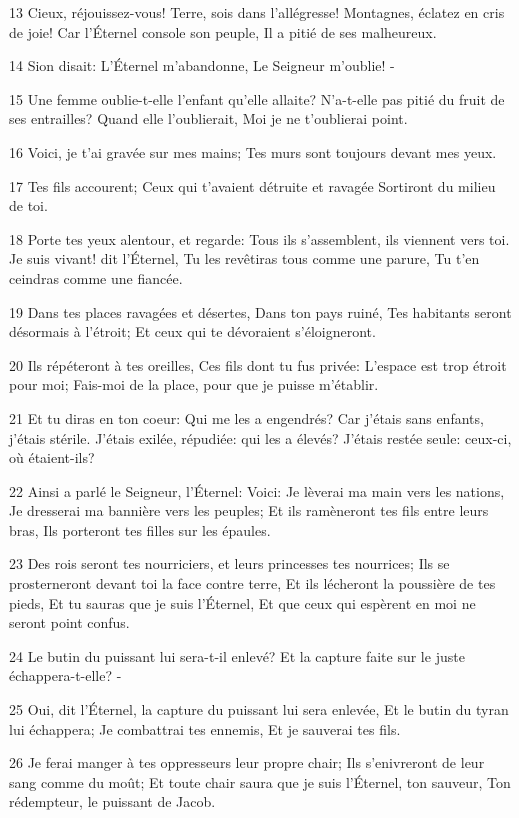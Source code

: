 \par 13 Cieux, réjouissez-vous! Terre, sois dans l'allégresse! Montagnes, éclatez en cris de joie! Car l'Éternel console son peuple, Il a pitié de ses malheureux.
\par 14 Sion disait: L'Éternel m'abandonne, Le Seigneur m'oublie! -
\par 15 Une femme oublie-t-elle l'enfant qu'elle allaite? N'a-t-elle pas pitié du fruit de ses entrailles? Quand elle l'oublierait, Moi je ne t'oublierai point.
\par 16 Voici, je t'ai gravée sur mes mains; Tes murs sont toujours devant mes yeux.
\par 17 Tes fils accourent; Ceux qui t'avaient détruite et ravagée Sortiront du milieu de toi.
\par 18 Porte tes yeux alentour, et regarde: Tous ils s'assemblent, ils viennent vers toi. Je suis vivant! dit l'Éternel, Tu les revêtiras tous comme une parure, Tu t'en ceindras comme une fiancée.
\par 19 Dans tes places ravagées et désertes, Dans ton pays ruiné, Tes habitants seront désormais à l'étroit; Et ceux qui te dévoraient s'éloigneront.
\par 20 Ils répéteront à tes oreilles, Ces fils dont tu fus privée: L'espace est trop étroit pour moi; Fais-moi de la place, pour que je puisse m'établir.
\par 21 Et tu diras en ton coeur: Qui me les a engendrés? Car j'étais sans enfants, j'étais stérile. J'étais exilée, répudiée: qui les a élevés? J'étais restée seule: ceux-ci, où étaient-ils?
\par 22 Ainsi a parlé le Seigneur, l'Éternel: Voici: Je lèverai ma main vers les nations, Je dresserai ma bannière vers les peuples; Et ils ramèneront tes fils entre leurs bras, Ils porteront tes filles sur les épaules.
\par 23 Des rois seront tes nourriciers, et leurs princesses tes nourrices; Ils se prosterneront devant toi la face contre terre, Et ils lécheront la poussière de tes pieds, Et tu sauras que je suis l'Éternel, Et que ceux qui espèrent en moi ne seront point confus.
\par 24 Le butin du puissant lui sera-t-il enlevé? Et la capture faite sur le juste échappera-t-elle? -
\par 25 Oui, dit l'Éternel, la capture du puissant lui sera enlevée, Et le butin du tyran lui échappera; Je combattrai tes ennemis, Et je sauverai tes fils.
\par 26 Je ferai manger à tes oppresseurs leur propre chair; Ils s'enivreront de leur sang comme du moût; Et toute chair saura que je suis l'Éternel, ton sauveur, Ton rédempteur, le puissant de Jacob.

